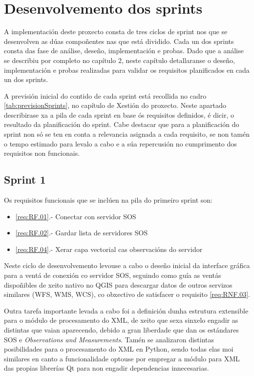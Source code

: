 \chapter{Desenvolvemento dos sprints}

A implementación deste proxecto consta de tres ciclos de sprint nos que se desenvolven as dúas compoñentes nas que está dividido. Cada un dos sprints consta das fase de análise, deseño, implementación e probas. Dado que a análise se describiu por completo no capítulo 2, neste capítulo detallaranse o deseño, implementación e probas realizadas para validar os requisitos planificados en cada un dos sprints.

A previsión inicial do contido de cada sprint está recollida no cadro \ref{tab:previsionSprints}, no capítulo de Xestión do proxecto. Neste apartado describirase xa a pila de cada sprint en base ós requisitos definidos, é dicir, o resultado da planificación do sprint. Cabe destacar que para a planificación do sprint non só se ten en conta a relevancia asignada a cada requisito, se non tamén o tempo estimado para levalo a cabo e a súa repercusión no cumprimento dos requisitos non funcionais.

\section{Sprint 1}
Os requisitos funcionais que se inclúen na pila do primeiro sprint son:
\begin{itemize}
\item \ref{req:RF.01}.- Conectar con servidor SOS
\item \ref{req:RF.02}.- Gardar lista de servidores SOS
\item \ref{req:RF.04}.- Xerar capa vectorial cas observacións do servidor
\end{itemize}

Neste ciclo de desenvolvemento levouse a cabo o deseño inicial da interface gráfica para a ventá de conexión co servidor SOS, seguindo como guía as ventás dispoñibles de xeito nativo no QGIS para descargar datos de outros servizos similares (WFS, WMS, WCS), co obxectivo de satisfacer o requisito \ref{req:RNF.03}.

Outra tarefa importante levada a cabo foi a definición dunha estrutura extensible para o módulo de procesamento do XML, de xeito que sexa sinxelo engadir as distintas que vaian aparecendo, debido a gran liberdade que dan os estándares SOS e \emph{Observations and Measurements}. Tamén se analizaron distintas posibilidades para o procesamento do XML en Python, sendo todas elas moi similares en canto a funcionalidade optouse por empregar a módulo para XML das propias librerías Qt para non engadir dependencias innecesarias.

